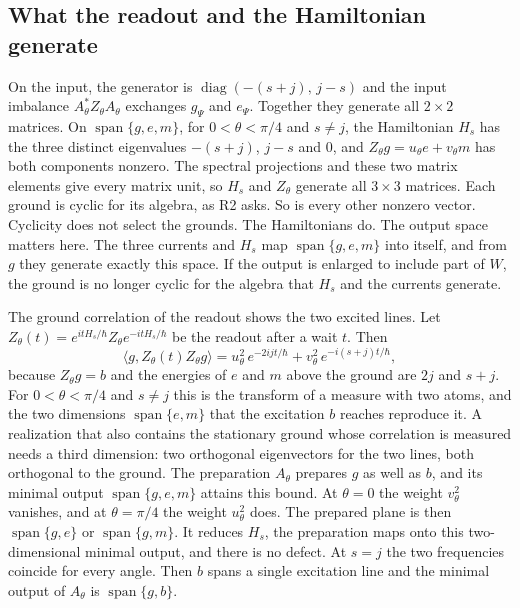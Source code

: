 \documentclass[11pt]{article}
\theoremstyle{definition}
\DeclareMathOperator{\Span}{span}
\begin{document}
\subsection{What the readout and the Hamiltonian generate}
\label{subsec:pair-currents-algebras}

On the input, the generator is $\operatorname{diag}(-(s+j),\,j-s)$ and the input imbalance $A_\theta^*Z_\theta A_\theta$ exchanges $g_\Psi$ and $e_\Psi$. Together they generate all $2\times2$ matrices. On $\Span\{g,e,m\}$, for $0<\theta<\pi/4$ and $s\ne j$, the Hamiltonian $H_s$ has the three distinct eigenvalues $-(s+j)$, $j-s$ and $0$, and $Z_\theta g=u_\theta e+v_\theta m$ has both components nonzero. The spectral projections and these two matrix elements give every matrix unit, so $H_s$ and $Z_\theta$ generate all $3\times3$ matrices. Each ground is cyclic for its algebra, as R2 asks. So is every other nonzero vector. Cyclicity does not select the grounds. The Hamiltonians do. The output space matters here. The three currents and $H_s$ map $\Span\{g,e,m\}$ into itself, and from $g$ they generate exactly this space. If the output is enlarged to include part of $W$, the ground is no longer cyclic for the algebra that $H_s$ and the currents generate.

The ground correlation of the readout shows the two excited lines. Let $Z_\theta(t)=e^{itH_s/\hbar}Z_\theta e^{-itH_s/\hbar}$ be the readout after a wait $t$. Then
\begin{equation}
 \langle g,Z_\theta(t)Z_\theta g\rangle
 =u_\theta^2\,e^{-2ijt/\hbar}+v_\theta^2\,e^{-i(s+j)t/\hbar},
 \label{eq:pair-currents-correlation}
\end{equation}
because $Z_\theta g=b$ and the energies of $e$ and $m$ above the ground are $2j$ and $s+j$. For $0<\theta<\pi/4$ and $s\ne j$ this is the transform of a measure with two atoms, and the two dimensions $\Span\{e,m\}$ that the excitation $b$ reaches reproduce it. A realization that also contains the stationary ground whose correlation is measured needs a third dimension: two orthogonal eigenvectors for the two lines, both orthogonal to the ground. The preparation $A_\theta$ prepares $g$ as well as $b$, and its minimal output $\Span\{g,e,m\}$ attains this bound. At $\theta=0$ the weight $v_\theta^2$ vanishes, and at $\theta=\pi/4$ the weight $u_\theta^2$ does. The prepared plane is then $\Span\{g,e\}$ or $\Span\{g,m\}$. It reduces $H_s$, the preparation maps onto this two-dimensional minimal output, and there is no defect. At $s=j$ the two frequencies coincide for every angle. Then $b$ spans a single excitation line and the minimal output of $A_\theta$ is $\Span\{g,b\}$.
\end{document}
